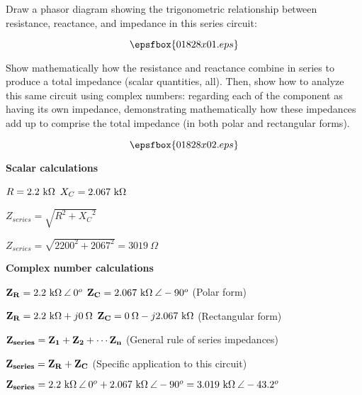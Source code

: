 

Draw a phasor diagram showing the trigonometric relationship between resistance, reactance, and impedance in this series circuit:

$$\epsfbox{01828x01.eps}$$

Show mathematically how the resistance and reactance combine in series to produce a total impedance (scalar quantities, all).  Then, show how to analyze this same circuit using complex numbers: regarding each of the component as having its own impedance, demonstrating mathematically how these impedances add up to comprise the total impedance (in both polar and rectangular forms).







$$\epsfbox{01828x02.eps}$$

\goodbreak

\noindent
{\bf Scalar calculations}

$R = 2.2 \hbox{ k}\Omega$ \hskip 20pt $X_C = 2.067 \hbox{ k}\Omega$

$Z_{series} = \sqrt{R^2 + {X_C}^2}$

$Z_{series} = \sqrt{2200^2 + 2067^2} = 3019 \> \Omega$

\vskip 10pt

\goodbreak

\noindent
{\bf Complex number calculations}

${\bf Z_R} = 2.2 \hbox{ k}\Omega \> \angle \> 0^o$ \hskip 20pt ${\bf Z_C} = 2.067 \hbox{ k}\Omega \> \angle -90^o$ \hskip 10pt (Polar form)

${\bf Z_R} = 2.2 \hbox{ k}\Omega + j0 \> \Omega$ \hskip 20pt ${\bf Z_C} = 0 \> \Omega - j2.067 \hbox{ k}\Omega$ \hskip 10pt (Rectangular form)

\vskip 5pt

${\bf Z_{series}} = {\bf Z_1} + {\bf Z_2} + \cdots {\bf Z_n}$ \hskip 10pt (General rule of series impedances)

${\bf Z_{series}} = {\bf Z_R} + {\bf Z_C}$ \hskip 10pt (Specific application to this circuit)

\vskip 5pt

${\bf Z_{series}} = 2.2 \hbox{ k}\Omega \> \angle \> 0^o + 2.067 \hbox{ k}\Omega \> \angle -90^o = 3.019 \hbox{ k}\Omega \> \angle -43.2^o$ 

